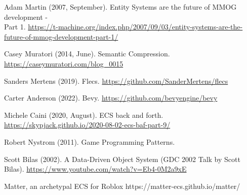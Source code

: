 \documentclass[openany, amssymb, psamsfonts]{amsart}
\theoremstyle{definition}
\numberwithin{equation}{section}
\begin{document}
\begin{thebibliography}{9}

Adam Martin (2007, September).
Entity Systems are the future of MMOG development - \\ Part 1.
\url{https://t-machine.org/index.php/2007/09/03/entity-systems-are-the-future-of-mmog-development-part-1/}

Casey Muratori (2014, June). 
Semantic Compression.
\url{https://caseymuratori.com/blog_0015}

Sanders Mertens (2019). 
Flecs. 
\url{https://github.com/SanderMertens/flecs}

Carter Anderson (2022).
Bevy. 
\url{https://github.com/bevyengine/bevy}

Michele Caini (2020, August). 
ECS back and forth. 
\url{https://skypjack.github.io/2020-08-02-ecs-baf-part-9/}

Robert Nystrom (2011). 
Game Programming Patterns.

Scott Bilas (2002). 
A Data-Driven Object System (GDC 2002 Talk by Scott Bilas). 
\url{https://www.youtube.com/watch?v=Eb4-0M2a9xE}

Matter, an archetypal ECS for Roblox
https://matter-ecs.github.io/matter/

\end{thebibliography}
\end{document}
